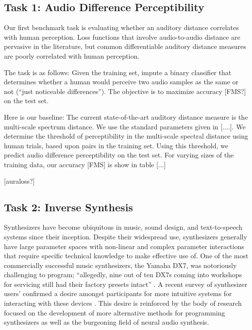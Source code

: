 
\subsection{Task 1: Audio Difference Perceptibility}


Our first benchmark task is evaluating whether an auditory distance correlates with human perception. Loss functions that involve audio-to-audio distance are pervasive in the literature, but common differentiable auditory distance measures are poorly correlated with human perception.

The task is as follows: Given the training set, impute a binary classifier that determines whether a human would perceive two audio samples as the same or not (``just noticeable differences''). The objective is to maximize accuracy [FMS?] on the test set.

Here is our baseline: The current state-of-the-art auditory distance measure is the multi-scale spectrum distance. We use the standard parameters given in [....]. We determine the threshold of perceptibility in the multi-scale spectral distance using human trials, based upon pairs in the training set. Using this threshold, we predict audio difference perceptibility on the test set. For varying sizes of the training data, our accuracy [FMS] is show in table [...]

[auraloss?]



\subsection{Task 2: Inverse Synthesis}

Synthesizers have become ubiquitous in music, sound design, and text-to-speech systems since their inception. Despite their widespread use, synthesizers generally have large parameter spaces with non-linear and complex parameter interactions that require specific technical knowledge to make effective use of. One of the most commercially successful music synthesizers, the Yamaha DX7, was notoriously challenging to program; ``allegedly, nine out of ten DX7s coming into workshops for servicing still had their factory presets intact'' \cite{ seago2004critical}. A recent survey of synthesizer users’ confirmed a desire amongst participants for more intuitive systems for interacting with these devices \cite{krekovic2019insights}. This desire is reinforced by the body of research focused on the development of more alternative methods for programming synthesizers as well as the burgeoning field of neural audio synthesis. 

